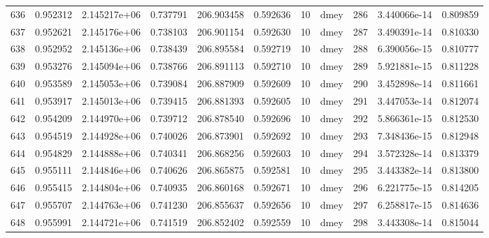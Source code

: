 \begin{tabular}{lrrrrrrlrrr}
636  &    0.952312 &        2.145217e+06 &  0.737791 &              206.903458 &    0.592636 &      10 &         dmey &    286 &   3.440066e-14 &      0.809859 \\
637  &    0.952621 &        2.145176e+06 &  0.738103 &              206.901154 &    0.592630 &      10 &         dmey &    287 &   3.490391e-14 &      0.810330 \\
638  &    0.952952 &        2.145136e+06 &  0.738439 &              206.895584 &    0.592719 &      10 &         dmey &    288 &   6.390056e-15 &      0.810777 \\
639  &    0.953276 &        2.145094e+06 &  0.738766 &              206.891113 &    0.592710 &      10 &         dmey &    289 &   5.921881e-15 &      0.811228 \\
640  &    0.953589 &        2.145053e+06 &  0.739084 &              206.887909 &    0.592609 &      10 &         dmey &    290 &   3.452898e-14 &      0.811661 \\
641  &    0.953917 &        2.145013e+06 &  0.739415 &              206.881393 &    0.592605 &      10 &         dmey &    291 &   3.447053e-14 &      0.812074 \\
642  &    0.954209 &        2.144970e+06 &  0.739712 &              206.878540 &    0.592696 &      10 &         dmey &    292 &   5.866361e-15 &      0.812530 \\
643  &    0.954519 &        2.144928e+06 &  0.740026 &              206.873901 &    0.592692 &      10 &         dmey &    293 &   7.348436e-15 &      0.812948 \\
644  &    0.954829 &        2.144888e+06 &  0.740341 &              206.868256 &    0.592603 &      10 &         dmey &    294 &   3.572328e-14 &      0.813379 \\
645  &    0.955111 &        2.144846e+06 &  0.740626 &              206.865875 &    0.592581 &      10 &         dmey &    295 &   3.443382e-14 &      0.813800 \\
646  &    0.955415 &        2.144804e+06 &  0.740935 &              206.860168 &    0.592671 &      10 &         dmey &    296 &   6.221775e-15 &      0.814205 \\
647  &    0.955707 &        2.144763e+06 &  0.741230 &              206.855637 &    0.592656 &      10 &         dmey &    297 &   6.258817e-15 &      0.814636 \\
648  &    0.955991 &        2.144721e+06 &  0.741519 &              206.852402 &    0.592559 &      10 &         dmey &    298 &   3.443308e-14 &      0.815044 \\

\end{tabular}
